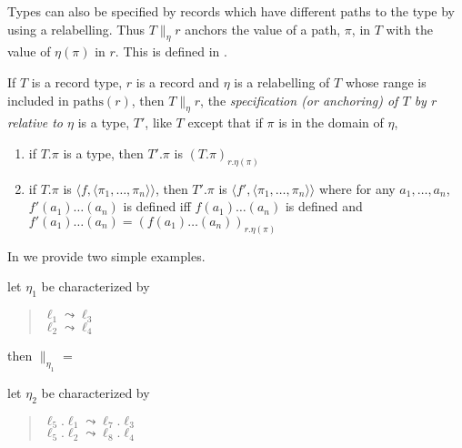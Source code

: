 \begin{shaded}
Types can also be specified by records which have different paths to
the type by using a relabelling.  Thus $T\parallel_\eta r$ anchors the
value of a path, $\pi$, in $T$ with the value of $\eta(\pi)$ in
$r$. %
This is defined in \nexteg{}.
\begin{ex} 
 If $T$ is a record type, $r$ is a record and $\eta$ is a relabelling
 of $T$ whose range is included in $\mathrm{paths}(r)$, then $T\parallel_\eta r$,  the
\textit{specification (or anchoring) of $T$ by
$r$ relative to $\eta$} is a type, $T'$, like $T$ except that if $\pi$
is in the domain of $\eta$,  
\begin{enumerate}
\item  if
$T.\pi$ is a type, then $T'.\pi$ is $(T.\pi)_{r.\eta(\pi)}$ 

\item if $T.\pi$ is $\langle f,\langle\pi_1,\ldots,\pi_n\rangle\rangle$, then
  $T'.\pi$ is $\langle f',\langle\pi_1,\ldots,\pi_n\rangle\rangle$ where for any
  $a_1,\ldots,a_n$, $f'(a_1)\ldots(a_n)$ is defined iff
  $f(a_1)\ldots(a_n)$ is defined and $f'(a_1)\ldots(a_n) =
  (f(a_1)\ldots(a_n))_{r.\eta(\pi)}$
\end{enumerate} 
\end{ex} 
In \nexteg{} we provide two simple examples.
\begin{ex} 
\begin{subex} 
 
\item let $\eta_1$ be characterized by
  \begin{quote}
    $\ell_1\leadsto\ell_3$\\
    $\ell_2\leadsto\ell_4$
  \end{quote}
  
 
\item then  $\parallel_{\eta_1}$ 
=
\item let $\eta_2$ be characterized by
  \begin{quote}
    $\ell_5.\ell_1\leadsto\ell_7.\ell_3$\\
    $\ell_5.\ell_2\leadsto\ell_8.\ell_4$
  \end{quote}



\end{subex}
\end{ex}
\end{shaded}
